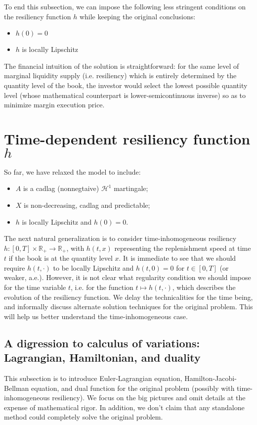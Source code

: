 \documentclass[openany,oneside]{article}
\theoremstyle{definition}
\theoremstyle{remark}
\begin{document}
To end this subsection, we can impose the following less stringent conditions on the resiliency function $h$ while keeping the original conclusions:
\begin{itemize}
\item $h(0)=0$
\item $h$ is locally Lipschitz
\end{itemize}
The financial intuition of the solution is straightforward: for the same level of marginal liquidity supply (i.e. resiliency) which is entirely determined by the quantity level of the book, the investor would select the lowest possible quantity level (whose mathematical counterpart is lower-semicontinuous inverse) so as to minimize margin execution price.


\section{Time-dependent resiliency function $h$}
So far, we have relaxed the model to include:
\begin{itemize}
\item $A$ is a cadlag (nonnegtaive) $\mathcal{H}^1$ martingale;
\item $X$ is non-decreasing, cadlag and predictable;
\item $h$ is locally Lipschitz and $h(0)=0$.
\end{itemize}

The next natural generalization is to consider time-inhomogeneous resiliency $h:[0,T]\times \mathbb{R}_+ \to \mathbb{R}_+$, with $h(t,x)$ representing the replenishment speed at time $t$ if the book is at the quantity level $x$. It is immediate to see that we should require $h(t,\cdot)$ to be locally Lipschitz and $h(t,0)=0$ for $t\in[0,T]$ (or weaker, a.e.). However, it is not clear what regularity condition we should impose for the time variable $t$, i.e. for the function $t\mapsto h(t,\cdot)$, which describes the evolution of the resiliency function. We delay the technicalities for the time being, and informally discuss alternate solution techniques for the original problem. This will help us better understand the time-inhomogeneous case.

\subsection{A digression to calculus of variations: Lagrangian, Hamiltonian, and duality}
This subsection is to introduce Euler-Lagrangian equation, Hamilton-Jacobi-Bellman equation, and dual function for the original problem (possibly with time-inhomogeneous resiliency). We focus on the big pictures and omit details at the expense of mathematical rigor. In addition, we don't claim that any standalone method could completely solve the original problem.
\end{document}

